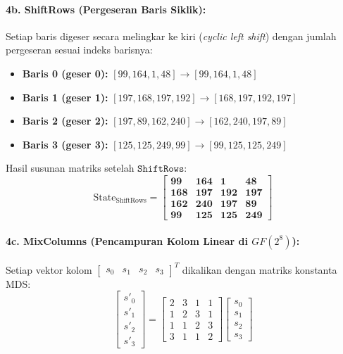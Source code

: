 \documentclass[11pt,a4paper]{article}
\begin{document}
\paragraph{4b. ShiftRows (Pergeseran Baris Siklik):}
Setiap baris digeser secara melingkar ke kiri (\textit{cyclic left shift}) dengan jumlah pergeseran sesuai indeks barisnya:
\begin{itemize}[leftmargin=*]
    \item \textbf{Baris 0 (geser 0):} $[99, 164, 1, 48] \longrightarrow [99, 164, 1, 48]$
    \item \textbf{Baris 1 (geser 1):} $[197, 168, 197, 192] \longrightarrow [168, 197, 192, 197]$
    \item \textbf{Baris 2 (geser 2):} $[197, 89, 162, 240] \longrightarrow [162, 240, 197, 89]$
    \item \textbf{Baris 3 (geser 3):} $[125, 125, 249, 99] \longrightarrow [99, 125, 125, 249]$
\end{itemize}
Hasil susunan matriks setelah $\mathtt{ShiftRows}$:
\begin{equation*}
\text{State}_{\text{ShiftRows}} = \mathbf{\begin{bmatrix}
99  & 164 & 1   & 48 \\
168 & 197 & 192 & 197 \\
162 & 240 & 197 & 89 \\
99  & 125 & 125 & 249
\end{bmatrix}}
\end{equation*}

\paragraph{4c. MixColumns (Pencampuran Kolom Linear di $GF(2^8)$):}
Setiap vektor kolom $\begin{bmatrix} s_0 & s_1 & s_2 & s_3 \end{bmatrix}^T$ dikalikan dengan matriks konstanta MDS:
\begin{equation*}
\begin{bmatrix} s'_0 \\ s'_1 \\ s'_2 \\ s'_3 \end{bmatrix} =
\begin{bmatrix}
2 & 3 & 1 & 1 \\
1 & 2 & 3 & 1 \\
1 & 1 & 2 & 3 \\
3 & 1 & 1 & 2
\end{bmatrix}
\begin{bmatrix} s_0 \\ s_1 \\ s_2 \\ s_3 \end{bmatrix}
\end{equation*}
\end{document}
